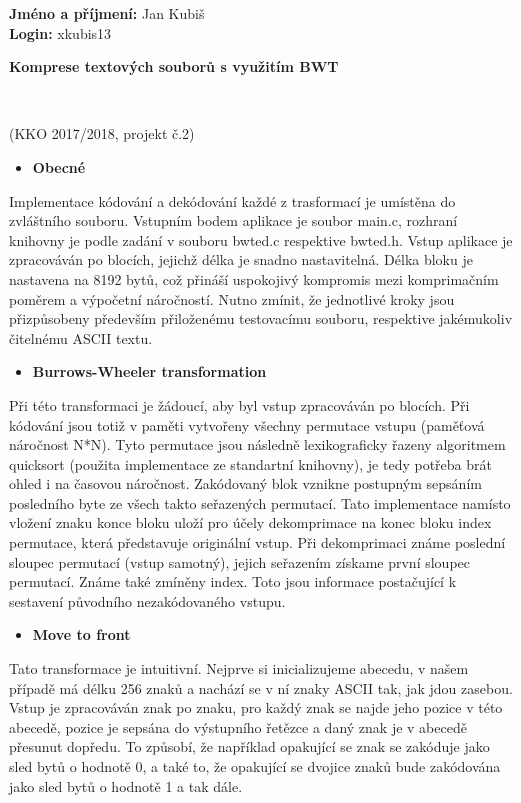 \documentclass[11pt,a4paper]{article}
\begin{document}
\noindent \textbf{Jméno a příjmení:} Jan Kubiš\\
\textbf{Login:} xkubis13\\
\smallskip
\begin{center}
	\begin{LARGE}\textbf{Komprese textových souborů s využitím BWT}\end{LARGE}\\
	\begin{large}(KKO 2017/2018, projekt č.2)\end{large}
\end{center}
\bigskip



\begin{itemize}[leftmargin=0cm]
\item{\textbf{Obecné}}
\end{itemize}
Implementace kódování a dekódování každé z trasformací je umístěna do zvláštního souboru. Vstupním bodem aplikace je soubor main.c, rozhraní knihovny je podle zadání v souboru bwted.c respektive bwted.h. Vstup aplikace je zpracováván po blocích, jejichž délka je snadno nastavitelná. Délka bloku je nastavena na 8192 bytů, což přináší uspokojivý kompromis mezi komprimačním poměrem a výpočetní náročností. Nutno zmínit, že jednotlivé kroky jsou přizpůsobeny především přiloženému testovacímu souboru, respektive jakémukoliv čitelnému ASCII textu.


\begin{itemize}[leftmargin=0cm]
\item{\textbf{Burrows-Wheeler transformation}}
\end{itemize}
Při této transformaci je žádoucí, aby byl vstup zpracováván po blocích. Při kódování jsou totiž v paměti vytvořeny všechny permutace vstupu (paměťová náročnost N*N). Tyto permutace jsou následně lexikograficky řazeny algoritmem quicksort (použita implementace ze standartní knihovny), je tedy potřeba brát ohled i na časovou náročnost. Zakódovaný blok vznikne postupným sepsáním posledního byte ze všech takto seřazených permutací. Tato implementace namísto vložení znaku konce bloku uloží pro účely dekomprimace na konec bloku index permutace, která představuje originální vstup. Při dekomprimaci známe poslední sloupec permutací (vstup samotný), jejich seřazením získame první sloupec permutací. Známe také zmíněny index. Toto jsou informace postačující k sestavení původního nezakódovaného vstupu.


\begin{itemize}[leftmargin=0cm]
\item{\textbf{Move to front}}
\end{itemize}
Tato transformace je intuitivní. Nejprve si inicializujeme abecedu, v našem případě má délku 256 znaků a nachází se v ní znaky ASCII tak, jak jdou zasebou. Vstup je zpracováván znak po znaku, pro každý znak se najde jeho pozice v této abecedě, pozice je sepsána do výstupního řetězce a daný znak je v abecedě přesunut dopředu. To způsobí, že například opakující se znak se zakóduje jako sled bytů o hodnotě 0, a také to, že opakující se dvojice znaků bude zakódována jako sled bytů o hodnotě 1 a tak dále.
\end{document}
